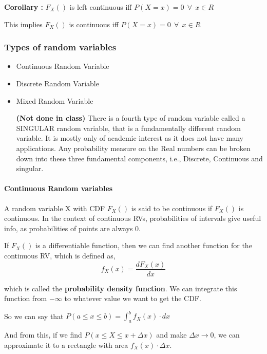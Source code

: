 \textbf{Corollary :} \(F_X()\) is left continuous iff
\(P(X = x) = 0 \ \ \forall \ \ x \in R\)

This implies \(F_X()\) is continuous iff
\(P(X = x) = 0 \ \ \forall \ \ x \in R\)

\hypertarget{types-of-random-variables}{%
\subsubsection{Types of random
variables}\label{types-of-random-variables}}

\begin{itemize}
\item
  Continuous Random Variable
\item
  Discrete Random Variable
\item
  Mixed Random Variable

  \textbf{(Not done in class)} There is a fourth type of random variable
  called a SINGULAR random variable, that is a fundamentally different
  random variable. It is mostly only of academic interest as it does not
  have many applications. Any probability measure on the Real numbers
  can be broken down into these three fundamental components, i.e.,
  Discrete, Continuous and singular.
\end{itemize}

\hypertarget{continuous-random-variables}{%
\paragraph{Continuous Random
variables}\label{continuous-random-variables}}

A random variable X with CDF \(F_X()\) is said to be continuous if
\(F_X()\) is continuous. In the context of continuous RVs, probabilities
of intervals give useful info, as probabilities of points are always 0.

If \(F_X()\) is a differentiable function, then we can find another
function for the continuous RV, which is defined as,
\[f_X(x) = \frac{dF_X(x)}{dx}\]

which is called the \textbf{probability density function}. We can
integrate this function from \(-\infty\) to whatever value we want to
get the CDF.

So we can say that
\(P(a \leq x \leq b) = \displaystyle\int_{a}^{b}f_X(x)\cdot dx\)

And from this, if we find \(P(x \leq X \leq x + \Delta x)\) and make
\(\Delta x \to 0\), we can approximate it to a rectangle with area
\(f_X(x) \cdot \Delta x\).

